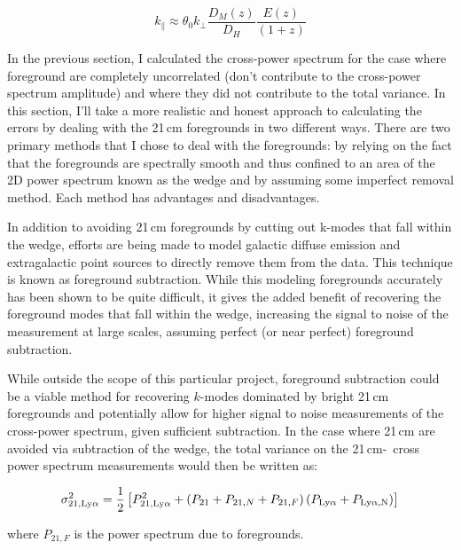 \begin{equation}
    k_{\parallel} \approx \theta_{0} k_{\perp} \frac{D_{M} \left( z \right) }{D_H} \frac{E \left( z \right)}{\left(1 + z\right)}
\end{equation}

In the previous section, I calculated the cross-power spectrum for the case where
foreground are completely uncorrelated (don't contribute to the cross-power spectrum
amplitude) and where they did not contribute to the total variance. In this section,
I'll take a more realistic and honest approach to calculating the errors by dealing
with the 21\,cm foregrounds in two different ways. There are two primary methods
that I chose to deal with the foregrounds: by relying on the fact that the foregrounds
are spectrally smooth and thus confined to an area of the 2D power spectrum known
as the wedge and by assuming some imperfect removal method. Each method has advantages
and disadvantages.

In addition to avoiding 21\,cm foregrounds by cutting out k-modes that fall within
the wedge, efforts are being made to model galactic diffuse emission and extragalactic
point sources to directly remove them from the data. This technique is known as
foreground subtraction. While this modeling foregrounds accurately has been shown
to be quite difficult, it gives the added benefit of recovering the foreground
modes that fall within the wedge, increasing the signal to noise of the measurement
at large scales, assuming perfect (or near perfect) foreground subtraction.

While outside the scope of this particular project, foreground subtraction could
be a viable method for recovering $k$-modes dominated by bright 21\,cm foregrounds
and potentially allow for higher signal to noise measurements of the cross-power
spectrum, given sufficient subtraction. In the case where 21\,cm are avoided via subtraction of the wedge,
the total variance on the 21\,cm-\lya\ cross power spectrum measurements would then be written as:

\begin{equation}
    	\sigma^2_{21, \rm Ly\alpha} = \frac{1}{2} \left[ P^2_{21, \rm Ly\alpha} +
      \left(P_{21} + P_{21, N} + P_{21, F} \right) \left( P_{\rm Ly\alpha} + P_{\text{Ly}\alpha, \text{N}}\right) \right]
\end{equation}

where $P_{21, F}$ is the power spectrum due to foregrounds.
